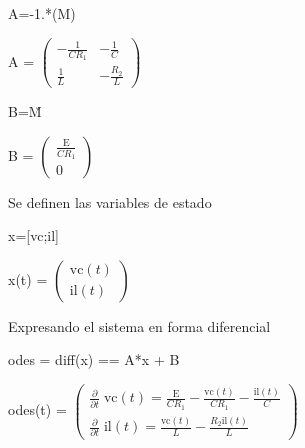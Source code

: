 \documentclass[10pt,a4paper]{article} %
\begin{document}
\begin{matlabcode}
	A=-1.*(M\N)
\end{matlabcode}
\begin{matlabsymbolicoutput}
	A = 
	$\displaystyle \left(\begin{array}{cc}
	-\frac{1}{C R_1 } & -\frac{1}{C}\\
	\frac{1}{L} & -\frac{R_2 }{L}
	\end{array}\right)$
\end{matlabsymbolicoutput}
\begin{matlabcode}
	
	B=M\u
\end{matlabcode}
\begin{matlabsymbolicoutput}
	B = 
	$\displaystyle \left(\begin{array}{c}
	\frac{\textrm{E}}{C R_1 }\\
	0
	\end{array}\right)$
\end{matlabsymbolicoutput}

\begin{par}
	\begin{flushleft}
		Se definen las variables de estado
	\end{flushleft}
\end{par}

\begin{matlabcode}
	x=[vc;il]
\end{matlabcode}
\begin{matlabsymbolicoutput}
	x(t) = 
	$\displaystyle \left(\begin{array}{c}
	\textrm{vc}\left(t\right)\\
	\textrm{il}\left(t\right)
	\end{array}\right)$
\end{matlabsymbolicoutput}

\begin{par}
	\begin{flushleft}
		Expresando el sistema en forma diferencial
	\end{flushleft}
\end{par}

\begin{matlabcode}
	odes = diff(x) ==  A*x + B
\end{matlabcode}
\begin{matlabsymbolicoutput}
	odes(t) = 
	$\displaystyle \left(\begin{array}{c}
	\frac{\partial }{\partial t}\;\textrm{vc}\left(t\right)=\frac{\textrm{E}}{C R_1 }-\frac{\textrm{vc}\left(t\right)}{C R_1 }-\frac{\textrm{il}\left(t\right)}{C}\\
	\frac{\partial }{\partial t}\;\textrm{il}\left(t\right)=\frac{\textrm{vc}\left(t\right)}{L}-\frac{R_2  \textrm{il}\left(t\right)}{L}
	\end{array}\right)$
\end{matlabsymbolicoutput}
\end{document}
